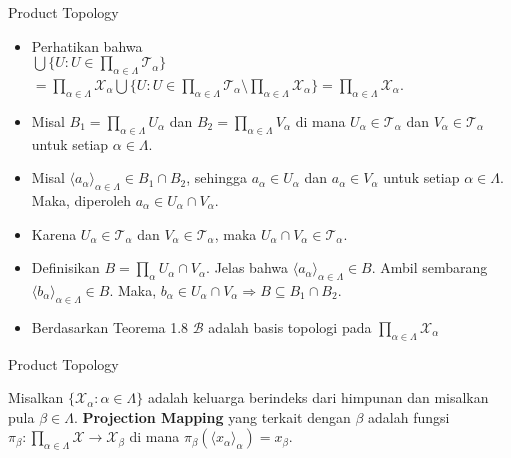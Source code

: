     \begin{frame}{Product Topology}
        \begin{itemize}
            \item Perhatikan bahwa\\ $\bigcup\{U: U \in \prod_{\alpha\in\Lambda} \mathcal{T}_\alpha\}$\\$= \prod_{\alpha\in\Lambda} \mathcal{X}_\alpha\bigcup\{U : U\in\prod_{\alpha\in\Lambda}\mathcal{T}_\alpha\setminus \prod_{\alpha\in\Lambda} \mathcal{X}_\alpha\}=\prod_{\alpha\in\Lambda} \mathcal{X}_\alpha$.
            \item Misal $B_1 = \prod_{\alpha\in\Lambda} U_\alpha$ dan $B_2 = \prod_{\alpha\in\Lambda}V_\alpha$ di mana $U_\alpha\in\mathcal{T}_\alpha$ dan $V_\alpha\in\mathcal{T}_\alpha$ untuk setiap $\alpha\in\Lambda$.
            \item Misal $\langle a_\alpha\rangle_{\alpha\in\Lambda}\in B_1\cap B_2$, sehingga $a_\alpha\in U_\alpha$ dan $a_\alpha\in V_\alpha$ untuk setiap $\alpha\in\Lambda$. Maka, diperoleh $a_\alpha\in U_\alpha\cap V_\alpha$.
            \item Karena $U_\alpha\in\mathcal{T}_\alpha$ dan $V_\alpha\in\mathcal{T}_\alpha$, maka $U_\alpha\cap V_\alpha\in\mathcal{T}_\alpha$.
            \item Definisikan $B = \prod_{\alpha}U_\alpha\cap V_\alpha$. Jelas bahwa $\langle a_\alpha\rangle_{\alpha\in\Lambda}\in B$. Ambil sembarang $\langle b_\alpha\rangle_{\alpha\in\Lambda}\in B$. Maka, $b_\alpha\in U_\alpha\cap V_\alpha\Rightarrow B\subseteq B_1\cap B_2$.
            \item Berdasarkan Teorema 1.8 $\mathcal{B}$ adalah basis topologi pada $\prod_{\alpha\in\Lambda} \mathcal{X}_\alpha$
        \end{itemize}
    \end{frame}
    
    \begin{frame}{Product Topology}
        \begin{tcolorbox}[enhanced,title=\textbf{Projection Mapping},frame style tile={width=\paperwidth}{wallpaper}]
            Misalkan $\{\mathcal{X}_{\alpha}:\alpha\in\Lambda\}$ adalah keluarga berindeks dari himpunan dan misalkan pula $\beta\in\Lambda$. \textbf{Projection Mapping} yang terkait dengan $\beta$ adalah fungsi $\pi_\beta: \prod_{\alpha\in\Lambda} \mathcal{X}\to\mathcal{X}_\beta$ di mana $\pi_\beta(\langle x_\alpha\rangle_{\alpha}) = x_\beta$.
        \end{tcolorbox}
    \end{frame}
    
